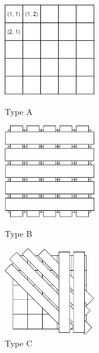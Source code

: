 \documentclass[twocolumn]{jarticle}     %
\begin{document}


  \begin{figure}[tb]
   \begin{minipage}{0.33\hsize}
   	\begin{center}
      \includegraphics[clip,width=40mm]{a.png}
      \caption{Type A}
      \label{fig:a}
   	\end{center}
   \end{minipage}
   \begin{minipage}{0.33\hsize}
   	\begin{center}
      \includegraphics[clip,width=40mm]{b.png}
      \caption{Type B}
      \label{fig:b}
   	\end{center}
   \end{minipage}
   \begin{minipage}{0.33\hsize}
   	\begin{center}
      \includegraphics[clip,width=40mm]{c.png}
      \caption{Type C}
      \label{fig:c}
   	\end{center}
   \end{minipage}
  \end{figure}
\end{document}
